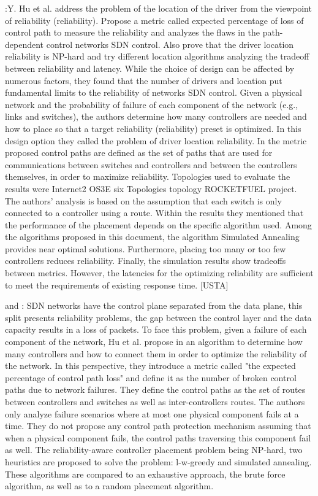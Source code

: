 \documentclass[a4paper,10pt]{article}
\begin{document}
\cite{HuWa14}:Y. Hu et al. address the problem of the location of the driver from the viewpoint of reliability (reliability). Propose a metric called expected percentage of loss of control path to measure the reliability and analyzes the flaws in the path-dependent control networks SDN control. Also prove that the driver location reliability is NP-hard and try different location algorithms analyzing the tradeoff between reliability and latency. While the choice of design can be affected by numerous factors, they found that the number of drivers and location put fundamental limits to the reliability of networks SDN control. Given a physical network and the probability of failure of each component of the network (e.g., links and switches), the authors determine how many controllers are needed and how to place so that a target reliability (reliability) preset is optimized. In this design option they called the problem of driver location reliability. In the metric proposed control paths are defined as the set of paths that are used for communications between switches and controllers and between the controllers themselves, in order to maximize reliability.
Topologies used to evaluate the results were Internet2 OS3E six Topologies topology ROCKETFUEL project. The authors' analysis is based on the assumption that each switch is only connected to a controller using a route. Within the results they mentioned that the performance of the placement depends on the specific algorithm used. Among the algorithms proposed in this document, the algorithm Simulated Annealing provides near optimal solutions. Furthermore, placing too many or too few controllers reduces reliability. Finally, the simulation results show tradeoffs between metrics. However, the latencies for the optimizing reliability are sufficient to meet the requirements of existing response time. [USTA]


\cite{HuWe13} and \cite{HuWa12}: SDN networks have the control plane separated from the data plane, this split presents reliability problems, the gap between the control layer and the data capacity results in a loss of packets. To face this problem,  given a failure of each component of the network, Hu et al. propose in \cite{HuWa12,HuWe13} an algorithm to determine how many controllers and how to connect them in order to optimize the reliability of the network. In this perspective, they introduce a metric called "the expected percentage of control path loss" and define it  as the number of broken control paths due to network failures. They define the control paths as the set of routes between controllers and switches as well as inter-controllers routes. The authors only analyze failure scenarios where at most one physical component fails at a time. They do not propose any control path protection mechanism assuming that when a physical component fails, the control paths traversing this component fail as well. The reliability-aware controller placement problem being NP-hard, two heuristics are proposed to solve the problem: l-w-greedy and simulated annealing. These algorithms are compared to an exhaustive approach, the brute force algorithm, as well as to a random placement algorithm. 
\end{document}
